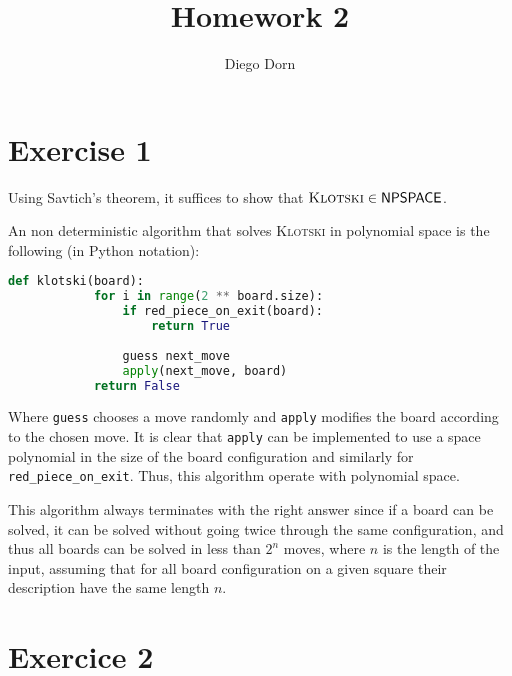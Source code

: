 

\title{Homework 2}
\author{Diego Dorn}

\newcommand{\klotski}{\textsc{Klotski}\xspace}
\newcommand{\UniqueSAT}{\textsc{UniqueSat}\xspace}
\newcommand{\UnSAT}{\textsc{UnSat}\xspace}
\newcommand{\SAT}{\textsc{Sat}\xspace}


    \maketitle

    \section*{Exercise 1}
    Using Savtich's theorem, it suffices to show that 
    $\klotski \in \NPSPACE$. 

    An non deterministic algorithm that solves \klotski
    in polynomial space is the following (in Python notation):

    \begin{lstlisting}[language=python]
        def klotski(board):
            for i in range(2 ** board.size):
                if red_piece_on_exit(board): 
                    return True
            
                guess next_move
                apply(next_move, board)
            return False
    \end{lstlisting}

    Where \texttt{guess} chooses a move randomly and \texttt{apply}
    modifies the board according to the chosen move. It is clear that
    \texttt{apply} can be implemented to use a space polynomial
    in the size of the board configuration and similarly for 
    \texttt{red\_piece\_on\_exit}.
    Thus, this algorithm operate with polynomial space.

    This algorithm always terminates with the right answer since
    if a board can be solved, it can be solved without going twice 
    through the same configuration, and thus all boards can be solved 
    in less than $2^n$ moves, where $n$ is the length of the input, 
    assuming that for all board configuration on a given square
    their description have the same length $n$.

    \section*{Exercice 2}


